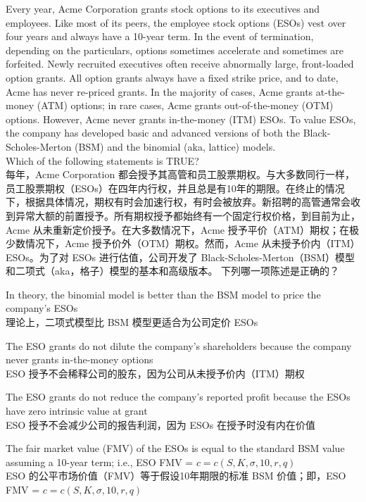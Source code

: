 \documentclass{article}
\newcounter{question} %
\begin{document}


\begin{question}
    Every year, Acme Corporation grants stock options to its executives and employees. Like most of its peers, the employee stock options (ESOs) vest over four years and always have a 10-year term. In the event of termination, depending on the particulars, options sometimes accelerate and sometimes are forfeited. Newly recruited executives often receive abnormally large, front-loaded option grants. All option grants always have a fixed strike price, and to date, Acme has never re-priced grants. In the majority of cases, Acme grants at-the-money (ATM) options; in rare cases, Acme grants out-of-the-money (OTM) options. However, Acme never grants in-the-money (ITM) ESOs. To value ESOs, the company has developed basic and advanced versions of both the Black-Scholes-Merton (BSM) and the binomial (aka, lattice) models.\\
    Which of the following statements is TRUE?
    \\每年，Acme Corporation 都会授予其高管和员工股票期权。与大多数同行一样，员工股票期权（ESOs）在四年内行权，并且总是有10年的期限。在终止的情况下，根据具体情况，期权有时会加速行权，有时会被放弃。新招聘的高管通常会收到异常大额的前置授予。所有期权授予都始终有一个固定行权价格，到目前为止，Acme 从未重新定价授予。在大多数情况下，Acme 授予平价（ATM）期权；在极少数情况下，Acme 授予价外（OTM）期权。然而，Acme 从未授予价内（ITM）ESOs。为了对 ESOs 进行估值，公司开发了 Black-Scholes-Merton（BSM）模型和二项式（aka，格子）模型的基本和高级版本。
    下列哪一项陈述是正确的？
\end{question}

\begin{choices}
    \item In theory, the binomial model is better than the BSM model to price the company's ESOs
    \\理论上，二项式模型比 BSM 模型更适合为公司定价 ESOs
    \item The ESO grants do not dilute the company's shareholders because the company never grants in-the-money options
    \\ESO 授予不会稀释公司的股东，因为公司从未授予价内（ITM）期权
    \item The ESO grants do not reduce the company's reported profit because the ESOs have zero intrinsic value at grant
    \\ESO 授予不会减少公司的报告利润，因为 ESOs 在授予时没有内在价值
    \item The fair market value (FMV) of the ESOs is equal to the standard BSM value assuming a 10-year term; i.e., ESO FMV = $c = c(S, K, \sigma, 10, r, q)$
    \\ESO 的公平市场价值（FMV）等于假设10年期限的标准 BSM 价值；即，ESO FMV = $c = c(S, K, \sigma, 10, r, q)$
\end{choices}
\end{document}
